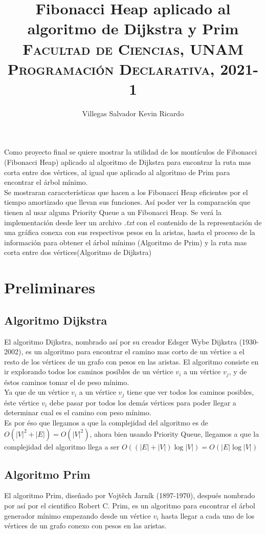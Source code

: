 \documentclass[a4paper, titlepage, 12pt]{article}
\title{\textbf{Fibonacci Heap aplicado al algoritmo de Dijkstra y Prim}\\
  \vspace{2.5cm}
  \textsc{Facultad de Ciencias, UNAM}\\
  \normalsize\textsc{Programación Declarativa, 2021-1}
}
\author{ Villegas Salvador Kevin Ricardo }
\theoremstyle{definition}%
\theoremstyle{Teorema}
\theoremstyle{break}
\begin{document}
\maketitle

Como proyecto final se quiere mostrar la utilidad de los montículos de Fibonacci (Fibonacci Heap)
aplicado al algoritmo de Dijkstra para encontrar la ruta mas corta entre dos vértices, al igual que 
aplicado al algoritmo de Prim para encontrar el árbol mínimo.\\

Se mostraran caraccterísticas que hacen a los Fibonacci Heap eficientes por el tiempo amortizado que 
llevan sus funciones. Así poder ver la comparación que tienen al usar alguna Priority Queue a un Fibonacci Heap. 
Se verá la implementación desde leer un archivo \textit{.txt} con el contenido de la representación 
de una gráfica conexa con sus respectivos pesos en la aristas, hasta el proceso de la información para obtener 
el árbol mínimo (Algoritmo de Prim) y la ruta mas corta entre dos vértices(Algoritmo de Dijkstra)

\section{Preliminares}

\subsection{Algoritmo Dijkstra}
El algoritmo Dijkstra, nombrado así por su creador Edsger Wybe Dijkstra (1930-2002), es un algoritmo para 
encontrar el camino mas corto de un vértice a el resto de los vértices de un grafo con pesos en las aristas. 
El algoritmo consiste en ir explorando todos los caminos posibles de un vértice $v_i$ a un vértice $v_j$, 
y de éstos caminos tomar el de peso mínimo.\\

Ya que de un vértice $v_i$ a un vértice $v_j$ tiene que ver todos los caminos posibles, éste vértice $v_i$ 
debe pasar por todos los demás vértices para poder llegar a determinar cual es el camino con peso mínimo.\\

Es por éso que llegamos a que la complejidad del algoritmo es de $O(|V|^2+|E|)=O(|V|^2)$, ahora bien usando 
Priority Queue, llegamos a que la complejidad del algoritmo llega a ser $O((|E|+|V|)\log|V|)=O(|E|\log|V|)$\cite{Complejidad}

\subsection{Algoritmo Prim}
El algoritmo Prim, diseñado por Vojtěch Jarník (1897-1970), después nombrado por así por el cientifico Robert C. Prim, es un 
algoritmo para encontrar el árbol generador mínimo empezando desde un vértice $v_i$ hasta llegar a cada uno de los vértices de 
un grafo conexo con pesos en las aristas.
\end{document}
